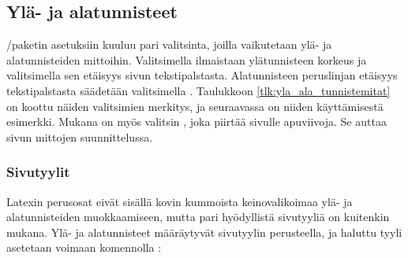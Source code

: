 \subsection{Ylä- ja alatunnisteet}
\label{luku:yla_ala_tunnisteet}

\-/paketin asetuksiin kuuluu pari valitsinta, joilla
vaikutetaan ylä- ja alatunnisteiden mittoihin. Valitsimella 
ilmaistaan ylätunnisteen korkeus ja valitsimella  sen
etäisyys sivun tekstipalstasta. Alatunnisteen peruslinjan etäisyys
tekstipalstasta säädetään valitsimella . Taulukkoon
\ref{tlk:yla_ala_tunnistemitat} on koottu näiden valitsimien merkitys,
ja seuraavassa on niiden käyttämisestä esimerkki. Mukana on myös
valitsin , joka piirtää sivulle apuviivoja. Se auttaa
sivun mittojen suunnittelussa.

\begin{koodilohkosis}
  \geometry{head=24bp, headsep=8bp, footskip=12mm, showframe}
\end{koodilohkosis}


\subsubsection{Sivutyylit}

Latexin perusosat eivät sisällä kovin kummoista keinovalikoimaa ylä- ja
alatunnisteiden muokkaamiseen, mutta pari hyödyllistä sivutyyliä on
kuitenkin mukana. Ylä- ja alatunnisteet määräytyvät sivutyylin
perusteella, ja haluttu tyyli asetetaan voimaan komennolla :

\begin{koodilohkosis}
  \pagestyle{plain}
\end{koodilohkosis}

